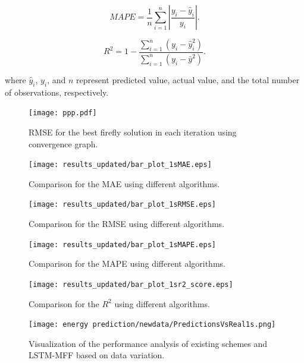 \documentclass[journal]{IEEEtran}
\begin{document}
\begin{equation}
MAPE = \frac{1}{n} \sum_{i=1}^{n} \left| \frac{y_i - \hat{y}_i}{y_i} \right|.
\label{MAPE1}
\end{equation}


\begin{equation}
    R^2 = 1-\frac{\sum_{i=1}^{n} (y_i -\hat{y}_i^2)}{\sum_{i=1}^{n} (y_i- \bar{y}^2)}.
    \label{R_Score}
\end{equation}

where \(\hat{y}_i \), \( y_i \), and \( n \) represent predicted value, actual value, and the total number of observations, respectively. 



 \begin{figure}[!h]
		\centering		\texttt{[image: ppp.pdf]}
		\caption{\centering RMSE for the best firefly solution in each iteration using convergence graph.}
		\label{ff and mff}
	\end{figure}



 \begin{figure}[!h]
		\centering
		\texttt{[image: results\_updated/bar\_plot\_1sMAE.eps]}
		\caption{\centering Comparison for the MAE using different algorithms.}
		\label{MAE}
	\end{figure}
\begin{figure}[!h]
		\centering
		\texttt{[image: results\_updated/bar\_plot\_1sRMSE.eps]}
		\caption{Comparison for the RMSE using different algorithms.}
		\label{RMSE}
	\end{figure}

 	

  	\begin{figure}[!h]
		\centering
		\texttt{[image: results\_updated/bar\_plot\_1sMAPE.eps]}
		\caption{Comparison for the MAPE using different algorithms.}
		\label{MAPE}
	\end{figure}

\begin{figure}[!h]
		\centering
		\texttt{[image: results\_updated/bar\_plot\_1sr2\_score.eps]}
		\caption{Comparison for the $R^2$ using different algorithms.}
		\label{R2}
	\end{figure}

 \begin{figure}[!h]
	\centering
	\texttt{[image: energy prediction/newdata/PredictionsVsReal1s.png]}
	\caption{\centering Visualization of the performance analysis of existing schemes and LSTM-MFF based on data variation.}
	\label{prediction vs real}
\end{figure}
\end{document}
